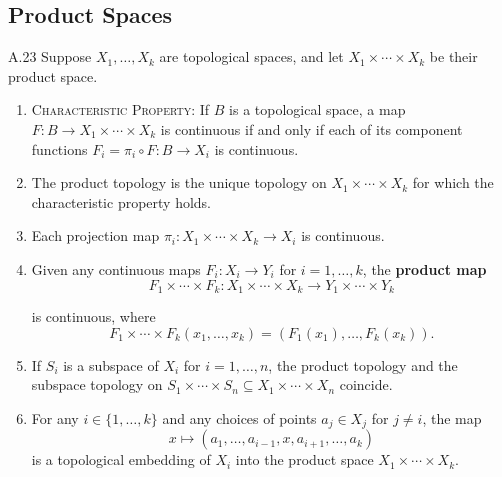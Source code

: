 \subsection{Product Spaces}

\begin{exercise}{A.23}
    Suppose \( X_{1}, \ldots, X_{k} \) are topological spaces, and let \( X_{1} \times \cdots \times X_{k} \) be their product space.

    \begin{enumerate}[itemsep=0pt,label={(\alph*)}]
        \item \textsc{Characteristic Property:} If \( B \) is a topological space, a map \( F: B \to X_{1} \times \cdots \times X_{k} \) is continuous if and only if each of its component functions \( F_{i} = \pi_{i} \circ F : B \to X_{i} \) is continuous.

        \item The product topology is the unique topology on \( X_{1} \times \cdots \times X_{k} \) for which the characteristic property holds.

        \item Each projection map \( \pi_{i} : X_{1} \times \cdots \times X_{k} \to X_{i} \) is continuous.

        \item Given any continuous maps \( F_{i} : X_{i} \to Y_{i} \) for \( i = 1, \ldots, k \), the \textbf{product map}
              \[
                  F_{1} \times \cdots \times F_{k} : X_{1} \times \cdots \times X_{k} \to Y_{1} \times \cdots \times Y_{k}
              \]

              is continuous, where
              \[
                  F_{1} \times \cdots \times F_{k}(x_{1}, \ldots, x_{k}) = (F_{1}(x_{1}), \ldots, F_{k}(x_{k})).
              \]

        \item If \( S_{i} \) is a subspace of \( X_{i} \) for \( i = 1, \ldots, n \), the product topology and the subspace topology on \( S_{1} \times \cdots \times S_{n} \subseteq X_{1} \times \cdots \times X_{n} \) coincide.

        \item For any \( i \in \{1, \ldots, k\} \) and any choices of points \( a_{j} \in X_{j} \) for \( j \neq i \), the map
              \[
                  x \mapsto (a_{1}, \ldots, a_{i-1}, x, a_{i+1}, \ldots, a_{k})
              \]
              is a topological embedding of \( X_{i} \) into the product space \( X_{1} \times \cdots \times X_{k} \).


\end{enumerate}
\end{exercise}
